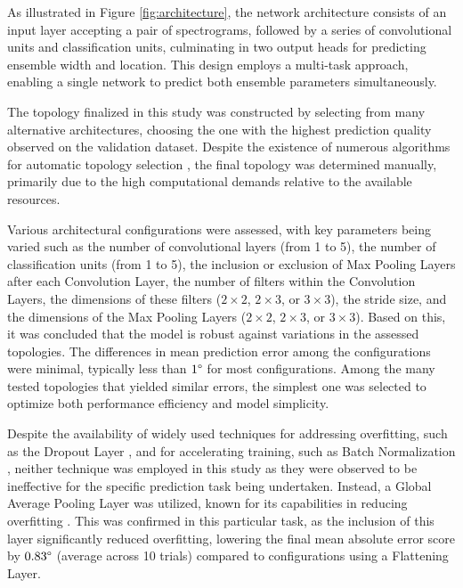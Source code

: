 \documentclass{article}
\begin{document}
As illustrated in Figure \ref{fig:architecture}, the network architecture consists of an input layer accepting a pair of spectrograms, followed by a series of convolutional units and classification units, culminating in two output heads for predicting ensemble width and location. This design employs a multi-task approach, enabling a single network to predict both ensemble parameters simultaneously.

The topology finalized in this study was constructed by selecting from many alternative architectures, choosing the one with the highest prediction quality observed on the validation dataset. Despite the existence of numerous algorithms for automatic topology selection \parencite{branke_evolutionary_1995, zhang_finding_2018, miikkulainen_evolving_2017, stanley_evolving_2002, shafiee_deep_2016}, the final topology was determined manually, primarily due to the high computational demands relative to the available resources.

Various architectural configurations were assessed, with key parameters being varied such as the number of convolutional layers (from 1 to 5), the number of classification units (from 1 to 5), the inclusion or exclusion of Max Pooling Layers after each Convolution Layer, the number of filters within the Convolution Layers, the dimensions of these filters ($2 \times 2$, $2 \times 3$, or $3 \times 3$), the stride size, and the dimensions of the Max Pooling Layers ($2 \times 2$, $2 \times 3$, or $3 \times 3$). Based on this, it was concluded that the model is robust against variations in the assessed topologies. The differences in mean prediction error among the configurations were minimal, typically less than $1\degree$ for most configurations. Among the many tested topologies that yielded similar errors, the simplest one was selected to optimize both performance efficiency and model simplicity.

Despite the availability of widely used techniques for addressing overfitting, such as the Dropout Layer \parencite{srivastava_dropout_2014}, and for accelerating training, such as Batch Normalization \parencite{ioffe_batch_2015}, neither technique was employed in this study as they were observed to be ineffective for the specific prediction task being undertaken. Instead, a Global Average Pooling Layer was utilized, known for its capabilities in reducing overfitting \parencite{lin_network_2013}. This was confirmed in this particular task, as the inclusion of this layer significantly reduced overfitting, lowering the final mean absolute error score by $0.83\degree$ (average across 10 trials) compared to configurations using a Flattening Layer.
\end{document}

